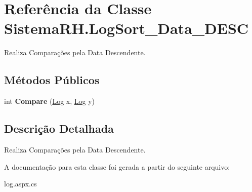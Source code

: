 \hypertarget{class_sistema_r_h_1_1_log_sort___data___d_e_s_c}{
\section{Referência da Classe SistemaRH.LogSort\_\-Data\_\-DESC}
\label{class_sistema_r_h_1_1_log_sort___data___d_e_s_c}
}


Realiza Comparações pela Data Descendente.  


\subsection*{Métodos Públicos}
\begin{DoxyCompactItemize}
\item 
\hypertarget{class_sistema_r_h_1_1_log_sort___data___d_e_s_c_a3d890c737246961ec0706628c3d41cb0}{
int {\bfseries Compare} (\hyperlink{class_sistema_r_h_1_1_log}{Log} x, \hyperlink{class_sistema_r_h_1_1_log}{Log} y)}
\label{class_sistema_r_h_1_1_log_sort___data___d_e_s_c_a3d890c737246961ec0706628c3d41cb0}

\end{DoxyCompactItemize}


\subsection{Descrição Detalhada}
Realiza Comparações pela Data Descendente. 

A documentação para esta classe foi gerada a partir do seguinte arquivo:\begin{DoxyCompactItemize}
\item 
log.aspx.cs\end{DoxyCompactItemize}
